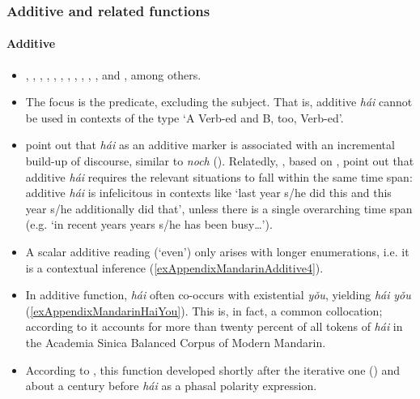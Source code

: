 \subsubsection{Additive and related functions}
\paragraph{Additive}
\label{exAppendixMandarinAdditive}
\begin{itemize}
	\item \textcite[ch. 2.3]{Alleton1972}, \textcite[344]{BiqHuang2016}, \textcite{Chen2018}, \textcite[106–117]{Chu1998}, \textcite[111–113]{Donazzan2008}, \textcite[344]{HuangShi2016}, \textcite[334–335]{LiThompson1981}, \textcite{Liu2000}, \textcite{Lu2019}, \textcite{Paris1988}, \textcite[88–89]{RossShengMa2014}, \textcite{Yeh1998} and \textcite{ZhangLing2016}, among others.
	\item The focus is the predicate, excluding the subject. That is, additive \textit{hái} cannot be used in contexts of the type \lq A Verb-ed and B, too, Verb-ed'.
	\item \textcite{ZhangLing2016} point out that \textit{hái} as an additive marker is associated with an incremental build-up of discourse, similar to  \textit{noch} (). Relatedly, \textcite{JingSchmidtGries2009}, based on \textcite{Ma2000}, point out that additive \textit{hái} requires the relevant situations to fall within the same time span: additive \textit{hái} is infelicitous in contexts like \lq last year \mbox{s/he} did this and this year \mbox{s/he} additionally did that', unless there is a single overarching time span (e.g. \lq in recent years years \mbox{s/he} has been busy…').	
	\item A scalar additive reading (\lq even') only arises with longer enumerations, i.e. it is a contextual inference (\ref{exAppendixMandarinAdditive4}).
	\item In additive function, \textit{hái} often co-occurs with existential \textit{yǒu}, yielding \textit{hái} \textit{yǒu} (\ref{exAppendixMandarinHaiYou}). This is, in fact, a common collocation; according to \textcite[60]{Lu2019} it accounts for more than twenty percent of all tokens of \textit{hái} in the Academia Sinica Balanced Corpus of Modern Mandarin.
	\item According to \textcite{Yeh1998}, this function developed shortly after the iterative one () and about a century before \textit{hái} as a phasal polarity expression.
	\end{itemize}

